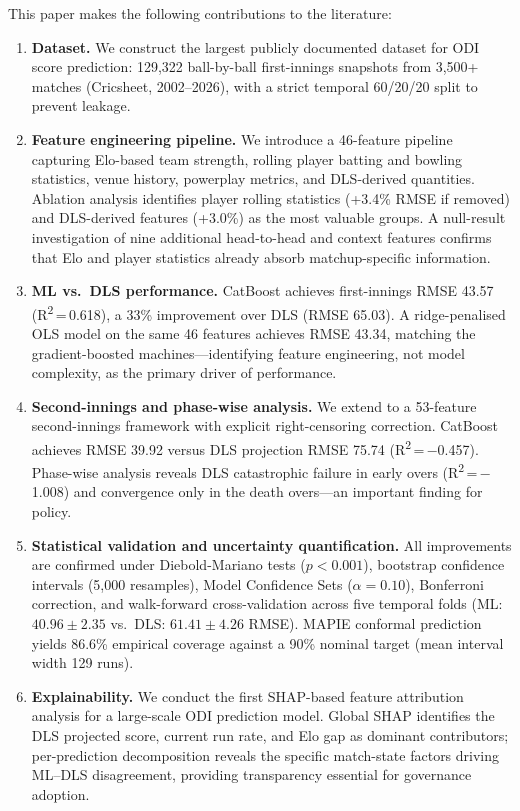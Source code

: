 \documentclass[10pt,a4paper,twocolumn]{article}
\begin{document}
This paper makes the following contributions to the literature:
\begin{enumerate}[leftmargin=1.2em,label=\arabic*.,itemsep=2pt]
\item \textbf{Dataset.} We construct the largest publicly documented dataset for ODI score prediction: 129,322 ball-by-ball first-innings snapshots from 3,500+ matches (Cricsheet, 2002--2026), with a strict temporal 60/20/20 split to prevent leakage.
\item \textbf{Feature engineering pipeline.} We introduce a 46-feature pipeline capturing Elo-based team strength, rolling player batting and bowling statistics, venue history, powerplay metrics, and DLS-derived quantities. Ablation analysis identifies player rolling statistics (+3.4\% RMSE if removed) and DLS-derived features (+3.0\%) as the most valuable groups. A null-result investigation of nine additional head-to-head and context features confirms that Elo and player statistics already absorb matchup-specific information.
\item \textbf{ML vs.\ DLS performance.} CatBoost achieves first-innings RMSE 43.57 (R\textsuperscript{2}\,=\,0.618), a 33\% improvement over DLS (RMSE 65.03). A ridge-penalised OLS model on the same 46 features achieves RMSE 43.34, matching the gradient-boosted machines---identifying feature engineering, not model complexity, as the primary driver of performance.
\item \textbf{Second-innings and phase-wise analysis.} We extend to a 53-feature second-innings framework with explicit right-censoring correction. CatBoost achieves RMSE 39.92 versus DLS projection RMSE 75.74 (R\textsuperscript{2}\,=\,$-$0.457). Phase-wise analysis reveals DLS catastrophic failure in early overs (R\textsuperscript{2}\,=\,$-$1.008) and convergence only in the death overs---an important finding for policy.
\item \textbf{Statistical validation and uncertainty quantification.} All improvements are confirmed under Diebold-Mariano tests ($p < 0.001$), bootstrap confidence intervals (5,000 resamples), Model Confidence Sets ($\alpha = 0.10$), Bonferroni correction, and walk-forward cross-validation across five temporal folds (ML: $40.96 \pm 2.35$ vs.\ DLS: $61.41 \pm 4.26$ RMSE). MAPIE conformal prediction yields 86.6\% empirical coverage against a 90\% nominal target (mean interval width 129 runs).
\item \textbf{Explainability.} We conduct the first SHAP-based feature attribution analysis for a large-scale ODI prediction model. Global SHAP identifies the DLS projected score, current run rate, and Elo gap as dominant contributors; per-prediction decomposition reveals the specific match-state factors driving ML--DLS disagreement, providing transparency essential for governance adoption.

\end{enumerate}
\end{document}
